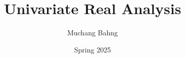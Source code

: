 \documentclass{article}
\begin{document}
\title{Univariate Real Analysis}
\author{Muchang Bahng}
\date{Spring 2025}

\maketitle
\tableofcontents
\pagebreak 


 
 
 
 
 
 


\end{document}
